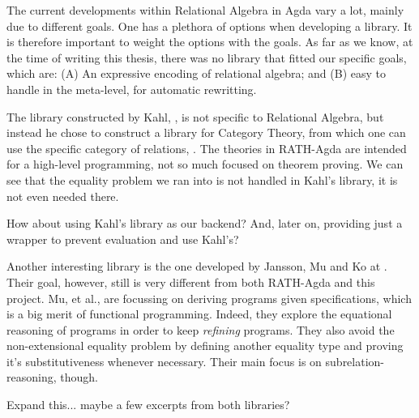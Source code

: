 The current developments within Relational Algebra in Agda vary a lot, mainly due to
different goals. One has a plethora of options when developing a library. It is therefore
important to weight the options with the goals. As far as we know, at the time
of writing this thesis, there was no library that fitted our specific goals, which
are: (A) An expressive encoding of relational algebra; and (B) easy to handle in the meta-level,
for automatic rewritting.

The library constructed by Kahl, \cite{RATHAgda}, is not specific to Relational Algebra, but
instead he chose to construct a library for Category Theory, from which one can use
the specific category of relations, . The theories in RATH-Agda are intended
for a high-level programming, not so much focused on theorem proving. We can see that
the equality problem we ran into is not handled in Kahl's library, it is not even needed there.
\begin{TODO}
  \item How about using Kahl's library as our backend? And, later on, providing just
        a wrapper to prevent evaluation and use Kahl's?
\end{TODO}

Another interesting library is the one developed by Jansson, Mu and Ko at \cite{Jansson09}. 
Their goal, however, still is very different from both RATH-Agda and this project.
Mu, et al., are focussing on deriving programs given specifications, which is a big merit of
functional programming. Indeed, they explore the equational reasoning of programs in order to keep
\emph{refining} programs. They also avoid the non-extensional equality problem by defining
another equality type and proving it's substitutiveness whenever necessary. Their main focus
is on subrelation-reasoning, though.

\begin{TODO}
  \item Expand this... maybe a few excerpts from both libraries?
\end{TODO}
